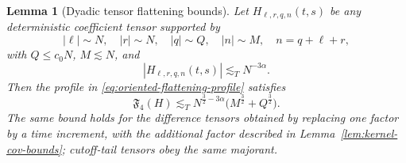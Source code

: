 \documentclass[10pt]{amsart}
\numberwithin{equation}{section}
\theoremstyle{plain}
\newtheorem{lemma}[theorem]{Lemma}
\theoremstyle{definition}
\theoremstyle{remark}
\begin{document}
\begin{lemma}[Dyadic tensor flattening bounds]\label{lem:dyadic-tensor-flattening}
Let $H_{\ell,r,q,n}(t,s)$ be any deterministic coefficient tensor supported by
\[
        |\ell|\sim N,\quad |r|\sim N,
        \quad |q|\sim Q,\quad |n|\sim M,\quad n=q+\ell+r,
\]
with $Q\le c_0N$, $M\lesssim N$, and
\begin{equation}\label{eq:centered-H-amplitude}
        |H_{\ell,r,q,n}(t,s)|\lesssim_T N^{-3\alpha}.
\end{equation}
Then the profile in \eqref{eq:oriented-flattening-profile} satisfies
\begin{equation}\label{eq:dyadic-flattening-bound}
        \mathfrak F_4(H)\lesssim_T
        N^{\frac32-3\alpha}\bigl(M^{\frac32}+Q^{\frac32}\bigr).
\end{equation}
The same bound holds for the difference tensors obtained by replacing one factor by a time increment, with the additional factor described in Lemma~\ref{lem:kernel-cov-bounds}; cutoff-tail tensors obey the same majorant.
\end{lemma}
\end{document}
